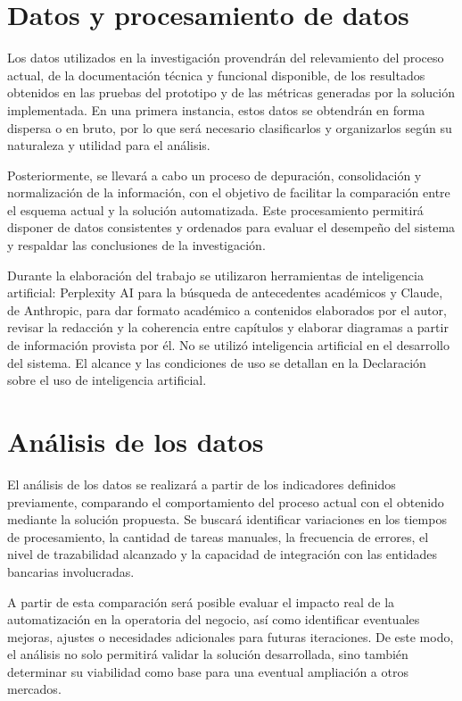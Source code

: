 \section{Datos y procesamiento de datos}

Los datos utilizados en la investigación provendrán del relevamiento del proceso actual, de la documentación técnica y funcional disponible, de los resultados obtenidos en las pruebas del prototipo y de las métricas generadas por la solución implementada. En una primera instancia, estos datos se obtendrán en forma dispersa o en bruto, por lo que será necesario clasificarlos y organizarlos según su naturaleza y utilidad para el análisis.

Posteriormente, se llevará a cabo un proceso de depuración, consolidación y normalización de la información, con el objetivo de facilitar la comparación entre el esquema actual y la solución automatizada. Este procesamiento permitirá disponer de datos consistentes y ordenados para evaluar el desempeño del sistema y respaldar las conclusiones de la investigación.

Durante la elaboración del trabajo se utilizaron herramientas de inteligencia artificial: Perplexity AI para la búsqueda de antecedentes académicos y Claude, de Anthropic, para dar formato académico a contenidos elaborados por el autor, revisar la redacción y la coherencia entre capítulos y elaborar diagramas a partir de información provista por él. No se utilizó inteligencia artificial en el desarrollo del sistema. El alcance y las condiciones de uso se detallan en la Declaración sobre el uso de inteligencia artificial.

\section{Análisis de los datos}

El análisis de los datos se realizará a partir de los indicadores definidos previamente, comparando el comportamiento del proceso actual con el obtenido mediante la solución propuesta. Se buscará identificar variaciones en los tiempos de procesamiento, la cantidad de tareas manuales, la frecuencia de errores, el nivel de trazabilidad alcanzado y la capacidad de integración con las entidades bancarias involucradas.

A partir de esta comparación será posible evaluar el impacto real de la automatización en la operatoria del negocio, así como identificar eventuales mejoras, ajustes o necesidades adicionales para futuras iteraciones. De este modo, el análisis no solo permitirá validar la solución desarrollada, sino también determinar su viabilidad como base para una eventual ampliación a otros mercados.

